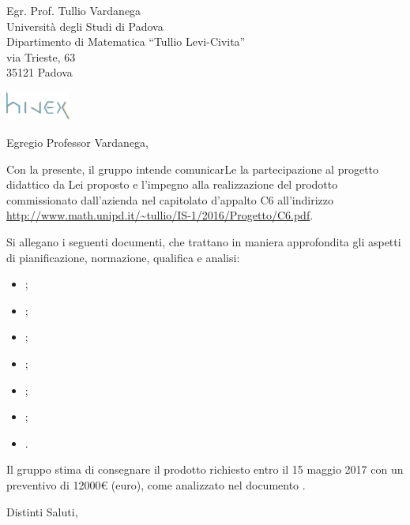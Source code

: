 \documentclass[a4paper]{letter} %
\date{Padova, \today}
\begin{document}
\begin{letter}{Egr. Prof. Tullio Vardanega\\
Università degli Studi di Padova\\
Dipartimento di Matematica “Tullio Levi-Civita”\\
via Trieste, 63\\
35121 Padova}

\includegraphics[width=80px]{../../util/hivex_logo3.png}

\opening{Egregio Professor Vardanega,}

Con la presente, il gruppo \hx{} intende comunicarLe la partecipazione al progetto didattico da Lei proposto e l'impegno alla realizzazione del prodotto \proj{} commissionato dall'azienda \ZU{} nel capitolato d'appalto C6 all'indirizzo \url{http://www.math.unipd.it/~tullio/IS-1/2016/Progetto/C6.pdf}.

Si allegano i seguenti documenti, che trattano in maniera approfondita gli aspetti di pianificazione, normazione, qualifica e analisi:
\begin{itemize}
	\item \SdF;
	\item \NdP;
	\item \PdP;
	\item \PdQ;
	\item \AdR;
	\item \Glossario;
	\item \Verbali.
\end{itemize}

Il gruppo \hx{} stima di consegnare il prodotto richiesto entro il 15 maggio 2017 con un preventivo di \num{12000}\euro{} (euro), come analizzato nel documento \PdP.

\closing{Distinti Saluti,}

\end{letter}
\end{document}
